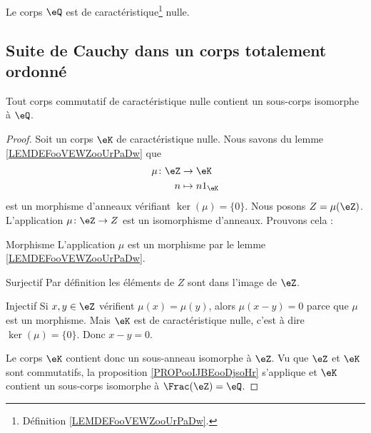 \begin{lemma}       \label{LEMooYCPUooNxEPhB}
    Le corps \( \eQ\) est de caractéristique\footnote{Définition \ref{LEMDEFooVEWZooUrPaDw}.} nulle.
\end{lemma}

\subsection{Suite de Cauchy dans un corps totalement ordonné}

\begin{lemma}        \label{LEMooLTBIooSZnvsQ}
    Tout corps commutatif de caractéristique nulle contient un sous-corps isomorphe à \( \eQ\).
\end{lemma}

\begin{proof}
    Soit un corps \( \eK\) de caractéristique nulle. Nous savons du lemme \ref{LEMDEFooVEWZooUrPaDw} que
    \begin{equation}
        \begin{aligned}
            \mu\colon \eZ&\to \eK \\
            n&\mapsto n1_{\eK} 
        \end{aligned}
    \end{equation}
    est un morphisme d'anneaux vérifiant \( \ker(\mu)=\{ 0 \}\). Nous posons \( Z=\mu(\eZ)\). L'application \( \mu\colon \eZ\to Z\) est un isomorphisme d'anneaux. Prouvons cela :
    \begin{subproof}
    \item[Morphisme]
        L'application \( \mu\) est un morphisme par le lemme \ref{LEMDEFooVEWZooUrPaDw}.
    \item[Surjectif]
        Par définition les éléments de \( Z\) sont dans l'image de \( \eZ\).
    \item[Injectif] Si \( x,y\in \eZ\) vérifient \( \mu(x)=\mu(y)\), alors \( \mu(x-y)=0\) parce que \( \mu\) est un morphisme. Mais \( \eK\) est de caractéristique nulle, c'est à dire \( \ker(\mu)=\{ 0 \}\). Donc \( x-y=0\).
    \end{subproof}
    Le corps \( \eK\) contient donc un sous-anneau isomorphe à \( \eZ\). Vu que \( \eZ\) et \( \eK\) sont commutatifs, la proposition \ref{PROPooIJBEooDjsoHr} s'applique et \( \eK\) contient un sous-corps isomorphe à \( \Frac(\eZ)=\eQ\).
\end{proof}

